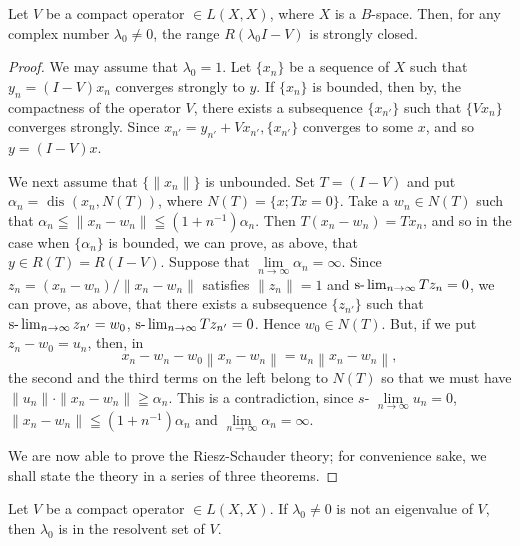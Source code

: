 \begin{lemman} Let $V$ be a compact operator $\in L(X, X)$, where $X$ is a $B$-space. Then, for any complex number $\lambda_{0} \neq 0$, the range $R(\lambda_{0}I - V)$ is strongly closed.

\end{lemman}
\begin{proof}
 We may assume that $\lambda_{0}=1$. Let $\{x_{n}\}$ be a sequence of $X$ such that $y_{n}=(I-V)x_{n}$ converges strongly to $y$. If $\{x_{n}\}$ is bounded, then by, the compactness of the operator $V$, there exists a subsequence $\{x_{n'}\}$ such that $\{Vx_{n}\}$ converges strongly. Since $x_{n'}=y_{n'}+Vx_{n'},\{x_{n'}\}$ converges to some $x$, and so $y=(I-V)x$. 

We next assume that $\{\| x_n \| \}$ is unbounded. Set $T = (I - V)$ and put $\alpha_n = \text{ dis }(x_n, N(T))$, where $N(T) = \{x; Tx = 0\}$. Take a $w_n \in N(T)$ such that $\alpha_n \leqq \| x_n - w_n \| \leqq (1 + n^{-1}) \alpha_n$. Then $T(x_n - w_n) = Tx_n$, and so in the case when $\{\alpha_n\}$ is bounded, we can prove, as above, that $y \in R(T) = R(I - V)$. Suppose that $\lim\limits_{n \to \infty} \alpha_n = \infty$. Since $z_n = (x_n - w_n) / \| x_n - w_n \| $ satisfies $ \| z_n \| = 1$ and $\text{s-}\lim\nolimits_{n \to \infty} T z_n = 0$, we can prove, as above, that there exists a subsequence $\{z_{n'}\}$ such that $\text{s-}\lim\nolimits_{n \to \infty} z_{n'} = w_0$, $\text{s-}\lim\nolimits_{n \to \infty} T z_{n'} = 0$. Hence $w_0 \in N(T)$. But, if we put $z_n - w_0 = u_n$, then, in 
\[
x _{n} - w _{n} - w _{0} \left\| x _{n} - w _{n} \right\| = u _{n} \left\| x _{n} - w _{n} \right\|,
\]
the second and the third terms on the left belong to $N(T)$ so that we must have $\| u_n \| \cdot \| x_n - w_n \| \geqq \alpha_n$. This is a contradiction, since $s \text{- } \lim\limits_{n \to \infty} u_n = 0$, $\| x_n - w_n \| \leqq (1 + n^{-1}) \alpha_n$ and $\lim\limits_{n \to \infty} \alpha_n = \infty$. 

We are now able to prove the Riesz-Schauder theory; for convenience sake, we shall state the theory in a series of three theorems. 
\end{proof}
\begin{theorem}\label{thm:X.5.Theorem.1} Let $V$ be a compact operator $\in L(X, X)$. If $\lambda_0 \neq 0$ is not an eigenvalue of $V$, then $\lambda_0$ is in the resolvent set of $V$. 
\end{theorem}

